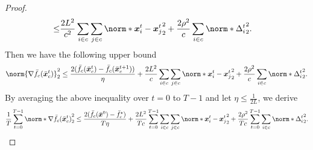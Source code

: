 \documentclass{article}
\begin{document}
\begin{proof}
\begin{align*}
     \le& \frac{2L^2}{c^2} \sum_{i\in c} \sum_{j\in c} \norm*{\xx^t_i
      - \xx_j^t}_2^2
     + \frac{2\rho^2}{c}\sum_{i\in c}\norm*{ \Delta_i^t}_2^2.
  \end{align*}
  Then we have the following upper bound
  \begin{equation}\label{eq:sd:1}
    \norm{\nabla \bar{f}_c(\bar{\xx}_c^t)}_2^2
    \le \frac{2(\bar{f}_c(\bar{\xx}_c^{t}) - \bar{f}_c(\bar{\xx}_c^{t+1}))}{\eta}
    + \frac{2L^2}{c}  \sum_{i\in c} \sum_{j\in c} \norm*{\xx^t_i
    - \xx_j^t}_2^2
    + \frac{2\rho^2}{c} \sum_{i\in c}\norm*{ \Delta_i^t}_2^2.
  \end{equation}
  By averaging the above inequality over $t=0$ to $T-1$ and let $\eta\le\frac{1}{2L}$, we derive
  \begin{multline*}
    \frac{1}{T} \sum_{t=0}^{T-1} \norm*{\nabla \bar{f}_c(\bar{\xx}_c^t)}_2^2
    \le \frac{2(\bar{f}_c(\bar{\xx}^{0}) - \bar{f}_c^\star)}{T\eta}
    + \frac{2L^2}{Tc} \sum_{t=0}^{T-1}  \sum_{i\in c} \sum_{j\in c} \norm*{\xx^t_i
    - \xx_j^t}_2^2
    + \frac{2\rho^2}{Tc} \sum_{t=0}^{T-1} \sum_{i\in c}\norm*{ \Delta_i^t}_2^2.
  \end{multline*}
\end{proof}
\end{document}
